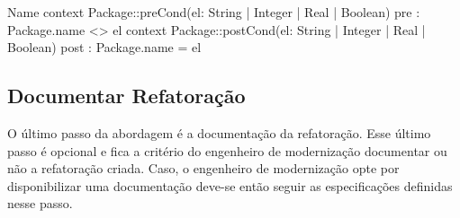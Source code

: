 \begin{codigo}[caption={[Asserções em OCL para realizar a operação atômica \texttt{change}.] Asserções em OCL para realizar a operação atômica \texttt{change}.},escapeinside={(*@}{@*)}, mathescape=true, basicstyle=\footnotesize, label={codigo:template_assercao_juntado_change}, language=OCL]{Name}
context Package::preCond(el: String | Integer | Real | Boolean)
pre : Package.name <> el
context Package::postCond(el: String | Integer | Real | Boolean)
post : Package.name = el
\end{codigo}






\subsection{Documentar Refatoração}\label{sec:template_refatoracao}

O último passo da abordagem é a documentação da refatoração. Esse último passo é opcional e fica a critério do engenheiro de modernização documentar ou não a refatoração criada. Caso, o engenheiro de modernização opte por disponibilizar uma documentação deve-se então seguir as especificações definidas nesse passo.

